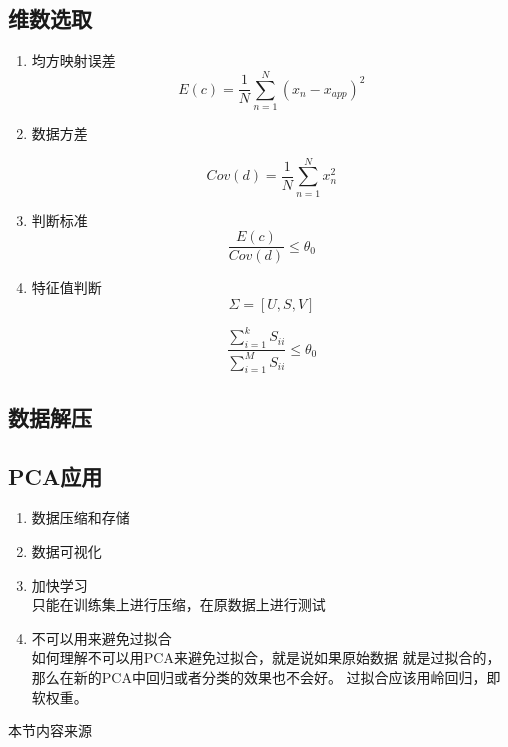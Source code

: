 \subsection{维数选取}

\begin{enumerate}
\item 均方映射误差
\begin{equation}
 E(c) = \frac{1}{N}\sum_{n=1}^N(x_n - x_{app})^2
\end{equation}
\item 数据方差

\begin{equation}
 Cov(d) = \frac{1}{N}\sum_{n=1}^Nx_n^2
\end{equation}

\item 判断标准
\begin{equation}
\frac{E(c)}{Cov(d)} \leq \theta_0
\end{equation}

\item 特征值判断
\begin{equation}
\Sigma = [U, S, V]
\end{equation}

\begin{equation}
\frac{\sum_{i = 1}^k S_{ii}}{\sum_{i = 1}^M S_{ii}} \leq \theta_0
\end{equation}
\end{enumerate}

\subsection{数据解压}

\subsection{PCA应用}
\begin{enumerate}
\item 数据压缩和存储
\item 数据可视化
\item 加快学习\\
只能在训练集上进行压缩，在原数据上进行测试
\item 不可以用来避免过拟合\cite{murphy2012machine,andrew2013courseramachinelearning}
\\ 如何理解不可以用PCA来避免过拟合，就是说如果原始数据
就是过拟合的，那么在新的PCA中回归或者分类的效果也不会好。
过拟合应该用岭回归，即软权重。
\end{enumerate}
本节内容来源\cite{andrew2013courseramachinelearning}
